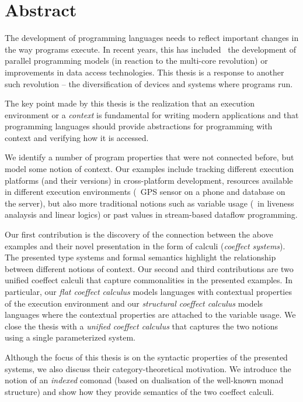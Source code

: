 
\begingroup
\let\clearpage\relax
\let\cleardoublepage\relax
\let\cleardoublepage\relax

\chapter*{Abstract} %
The development of programming languages needs to reflect important changes in the way
programs execute. In recent years, this has included \eg~the development of parallel programming 
models (in reaction to the multi-core revolution) or improvements in data access technologies. 
This thesis is a response to another such revolution -- the diversification of devices and 
systems where programs run. 

The key point made by this thesis is the realization that an execution environment or
a \emph{context} is fundamental for writing modern applications and that programming 
languages should provide abstractions for programming with context and verifying how 
it is accessed. 

We identify a number of program properties that were not connected before, but model some notion 
of context. Our examples include tracking different execution platforms (and their versions) 
in cross-platform development, resources available in different execution environments (\eg~GPS
sensor on a phone and database on the server), but also more traditional notions such as 
variable usage (\eg~in liveness analaysis and linear logics) or past values in 
stream-based dataflow programming.

Our first contribution is the discovery of the connection between the above examples and
their novel presentation in the form of calculi (\emph{coeffect systems}). The presented type 
systems and formal semantics highlight the relationship between different notions of context. 
Our second and third contributions are two unified coeffect calculi that capture commonalities 
in the presented examples. In particular, our \emph{flat coeffect calculus} models languages 
with contextual properties of the execution environment and our \emph{structural coeffect 
calculus} models languages where the contextual properties are attached to the variable usage.
We close the thesis with a \emph{unified coeffect calculus} that captures the two notions
using a single parameterized system.

Although the focus of this thesis is on the syntactic properties of the presented 
systems, we also discuss their category-theoretical motivation. We introduce the notion of
an \emph{indexed} comonad (based on dualisation of the well-known monad structure) and show 
how they provide semantics of the two coeffect calculi. 

\endgroup			

\vfill